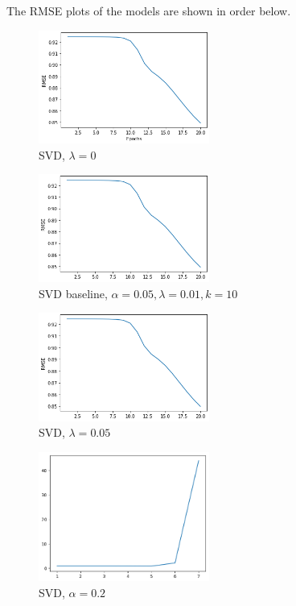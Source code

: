 \documentclass[final]{cvpr}
\begin{document}
\vspace{1cm}

The RMSE plots of the models are shown in order below.

\begin{figure}[h]
	\includegraphics[width=0.5\textwidth]{screenshot20210504225232.png}
	\caption{SVD, $\lambda=0$}
\end{figure}

\begin{figure}[h]
	\includegraphics[width=0.5\textwidth]{screenshot20210504225440.png}
	\caption{SVD baseline, $\alpha=0.05, \lambda=0.01, k=10$}
\end{figure}

\begin{figure}[h]
	\includegraphics[width=0.5\textwidth]{screenshot20210504225504.png}
	\caption{SVD, $\lambda=0.05$}
\end{figure}

\begin{figure}[h]
	\includegraphics[width=0.5\textwidth]{screenshot20210504225138.png}
	\caption{SVD, $\alpha=0.2$}
\end{figure}
\end{document}
